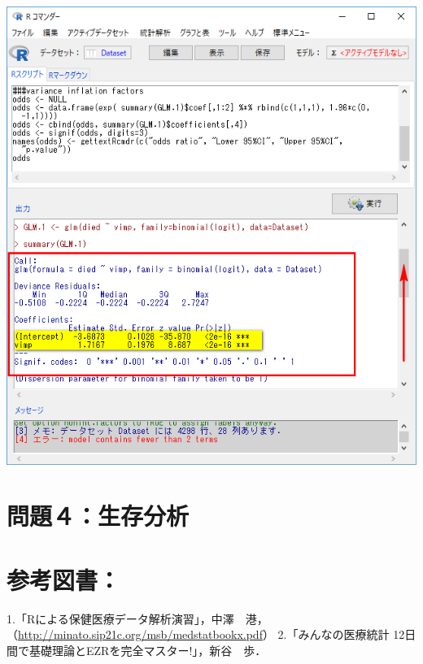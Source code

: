 \documentclass[11pt,]{problemset}
\begin{document}
\begin{center}\includegraphics[width=0.55\linewidth]{pic/logstic09} \end{center}

\newpage
\vfill

\section{問題４：生存分析}

\newpage
\vfill

\section{参考図書：}

1.「Rによる保健医療データ解析演習」，中澤　港，（\url{http://minato.sip21c.org/msb/medstatbookx.pdf}）
2.「みんなの医療統計 12日間で基礎理論とEZRを完全マスター!」，新谷　歩．
\end{document}

